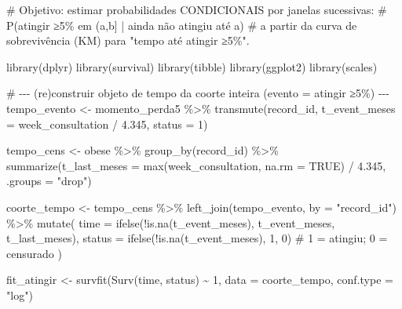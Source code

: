 \documentclass[
]{article}
\newenvironment{Shaded}{\begin{snugshade}}{\end{snugshade}}
\newcommand{\AttributeTok}[1]{\textcolor[rgb]{0.40,0.45,0.13}{#1}}
\newcommand{\CommentTok}[1]{\textcolor[rgb]{0.37,0.37,0.37}{#1}}
\newcommand{\ConstantTok}[1]{\textcolor[rgb]{0.56,0.35,0.01}{#1}}
\newcommand{\DecValTok}[1]{\textcolor[rgb]{0.68,0.00,0.00}{#1}}
\newcommand{\FloatTok}[1]{\textcolor[rgb]{0.68,0.00,0.00}{#1}}
\newcommand{\FunctionTok}[1]{\textcolor[rgb]{0.28,0.35,0.67}{#1}}
\newcommand{\NormalTok}[1]{\textcolor[rgb]{0.00,0.23,0.31}{#1}}
\newcommand{\OtherTok}[1]{\textcolor[rgb]{0.00,0.23,0.31}{#1}}
\newcommand{\SpecialCharTok}[1]{\textcolor[rgb]{0.37,0.37,0.37}{#1}}
\newcommand{\StringTok}[1]{\textcolor[rgb]{0.13,0.47,0.30}{#1}}
\begin{document}
\begin{Shaded}
\begin{Highlighting}[]
\CommentTok{\# Objetivo: estimar probabilidades CONDICIONAIS por janelas sucessivas:}
\CommentTok{\# P(atingir ≥5\% em (a,b] | ainda não atingiu até a)}
\CommentTok{\# a partir da curva de sobrevivência (KM) para "tempo até atingir ≥5\%".}

\FunctionTok{library}\NormalTok{(dplyr)}
\FunctionTok{library}\NormalTok{(survival)}
\FunctionTok{library}\NormalTok{(tibble)}
\FunctionTok{library}\NormalTok{(ggplot2)}
\FunctionTok{library}\NormalTok{(scales)}

\CommentTok{\# {-}{-}{-} (re)construir objeto de tempo da coorte inteira (evento = atingir ≥5\%) {-}{-}{-}}
\NormalTok{tempo\_evento }\OtherTok{\textless{}{-}}\NormalTok{ momento\_perda5 }\SpecialCharTok{\%\textgreater{}\%}
  \FunctionTok{transmute}\NormalTok{(record\_id, }\AttributeTok{t\_event\_meses =}\NormalTok{ week\_consultation }\SpecialCharTok{/} \FloatTok{4.345}\NormalTok{, }\AttributeTok{status =} \DecValTok{1}\NormalTok{)}

\NormalTok{tempo\_cens }\OtherTok{\textless{}{-}}\NormalTok{ obese }\SpecialCharTok{\%\textgreater{}\%}
  \FunctionTok{group\_by}\NormalTok{(record\_id) }\SpecialCharTok{\%\textgreater{}\%}
  \FunctionTok{summarize}\NormalTok{(}\AttributeTok{t\_last\_meses =} \FunctionTok{max}\NormalTok{(week\_consultation, }\AttributeTok{na.rm =} \ConstantTok{TRUE}\NormalTok{) }\SpecialCharTok{/} \FloatTok{4.345}\NormalTok{, }\AttributeTok{.groups =} \StringTok{"drop"}\NormalTok{)}

\NormalTok{coorte\_tempo }\OtherTok{\textless{}{-}}\NormalTok{ tempo\_cens }\SpecialCharTok{\%\textgreater{}\%}
  \FunctionTok{left\_join}\NormalTok{(tempo\_evento, }\AttributeTok{by =} \StringTok{"record\_id"}\NormalTok{) }\SpecialCharTok{\%\textgreater{}\%}
  \FunctionTok{mutate}\NormalTok{(}
    \AttributeTok{time   =} \FunctionTok{ifelse}\NormalTok{(}\SpecialCharTok{!}\FunctionTok{is.na}\NormalTok{(t\_event\_meses), t\_event\_meses, t\_last\_meses),}
    \AttributeTok{status =} \FunctionTok{ifelse}\NormalTok{(}\SpecialCharTok{!}\FunctionTok{is.na}\NormalTok{(t\_event\_meses), }\DecValTok{1}\NormalTok{, }\DecValTok{0}\NormalTok{)  }\CommentTok{\# 1 = atingiu; 0 = censurado}
\NormalTok{  )}

\NormalTok{fit\_atingir }\OtherTok{\textless{}{-}} \FunctionTok{survfit}\NormalTok{(}\FunctionTok{Surv}\NormalTok{(time, status) }\SpecialCharTok{\textasciitilde{}} \DecValTok{1}\NormalTok{, }\AttributeTok{data =}\NormalTok{ coorte\_tempo, }\AttributeTok{conf.type =} \StringTok{"log"}\NormalTok{)}


\end{Highlighting}
\end{Shaded}
\end{document}
